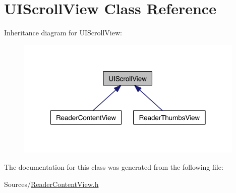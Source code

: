 \hypertarget{class_u_i_scroll_view}{\section{U\-I\-Scroll\-View Class Reference}
\label{d0/dd4/class_u_i_scroll_view}
}


Inheritance diagram for U\-I\-Scroll\-View\-:
\nopagebreak
\begin{figure}[H]
\begin{center}
\leavevmode
\includegraphics[width=309pt]{d2/d59/class_u_i_scroll_view__inherit__graph}
\end{center}
\end{figure}


The documentation for this class was generated from the following file\-:\begin{DoxyCompactItemize}
\item 
Sources/\hyperlink{_reader_content_view_8h}{Reader\-Content\-View.\-h}\end{DoxyCompactItemize}

